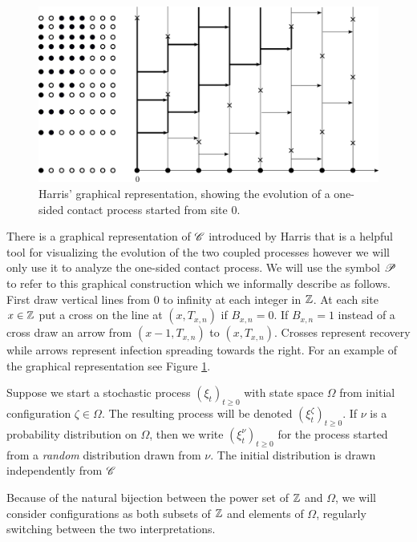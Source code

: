 \begin{figure}[!h]
  \includegraphics[width=\linewidth]{images/graphical_construction}
  \caption{Harris' graphical representation, showing the evolution of a one-sided contact process started from site $0$. }
  \label{fig:graphical_construction}
\end{figure}

There is a graphical representation of $\mathscr{C}$ introduced by Harris that is a helpful tool for visualizing the evolution of the two coupled processes however we will only use it to analyze the one-sided contact process. We will use the symbol $\mathscr{P}$ to refer to this graphical construction which we informally describe as follows. First draw vertical lines from $0$ to infinity at each integer in $\mathbb{Z}$. At each site $x \in \mathbb{Z}$ put a cross on the line at $(x, T_{x,n})$ if $B_{x,n} = 0$. If $B_{x,n} = 1$ instead of a cross draw an arrow from $(x - 1, T_{x,n})$ to $(x, T_{x,n})$. Crosses represent recovery while arrows represent infection spreading towards the right. For an example of the graphical representation see Figure \ref{fig:graphical_construction}. 

\begin{notation}
Suppose we start a stochastic process $(\xi_t)_{t \geq 0}$ with state space $\Omega$ from initial configuration $\zeta \in \Omega$. The resulting process will be denoted $(\xi^\zeta_t)_{t \geq 0}$. If $\nu$ is a probability distribution on $\Omega$, then we write $(\xi^\nu_t)_{t \geq 0}$ for the process started from a \textit{random} distribution drawn from $\nu$. The initial distribution is drawn independently from $\mathscr{C}$
\end{notation}
\begin{notation}\label{not:powerset}
Because of the natural bijection between the power set of $\mathbb{Z}$ and $\Omega$, we will consider configurations as both subsets of $\mathbb{Z}$ and elements of $\Omega$, regularly switching between the two interpretations. 
\end{notation}

